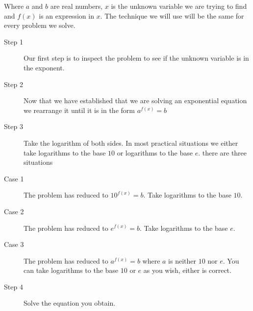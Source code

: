 Where $a$ and $b$ are real numbers, $x$ is the unknown variable we are trying to find and $f (x)$ is an expression in $x$. The technique we will use will be the same for every problem we solve. 


\begin{description}
	\item [Step 1] Our first step is to inspect the problem to see if the unknown
	variable is in the exponent. 
	
	\item [Step 2] Now that we have
	established that we are solving an exponential equation we rearrange it until it is in the form $a^{f (x)} =b$ 
	
	\item [Step 3] Take the logarithm
	of both sides. In most practical situations we either take logarithms to the base $10$ or logarithms to the base $e$. there are three situations 
	
	\item [Case
	1] The problem has reduced to $10^{f (x)} =b$. Take logarithms to the base $10$. 
	
	\item [Case 2] The problem has
	reduced to $e^{f (x)} =b$. Take logarithms to the base $e$. 
	
	\item [Case 3] The problem has
	reduced to $a^{f (x)} =b$ where $a$ is neither $10$ nor $e$. You can take logarithms to the base $10$ or $e$ as you wish, either is correct. 
	
	\item [Step 4]
	Solve the equation you obtain. \end{description}

